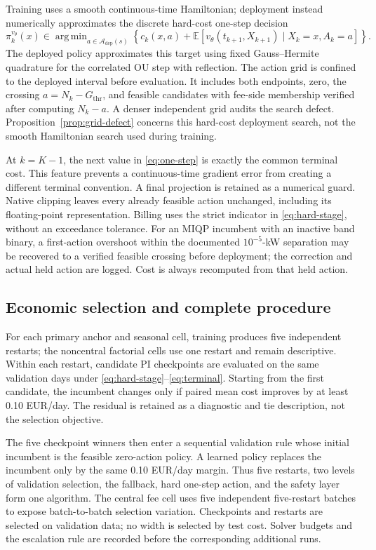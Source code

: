 \documentclass[preprint,11pt]{elsarticle}
\DeclareMathOperator*{\argmin}{arg\,min}
\newcommand{\E}{\mathbb{E}}
\newcommand{\cA}{\mathcal{A}}
\theoremstyle{plain}
\theoremstyle{remark}
\begin{document}
Training uses a smooth continuous-time Hamiltonian; deployment instead
numerically approximates the discrete hard-cost one-step decision
\begin{equation}
 \pi_k^{v_\theta}(x)\in\argmin_{a\in\cA_{\mathrm{dep}}(s)}
 \left\{c_k(x,a)+
 \E\left[v_\theta(t_{k+1},X_{k+1})\mid X_k=x,A_k=a\right]\right\}.
 \label{eq:one-step}
\end{equation}
The deployed policy approximates this target using fixed Gauss--Hermite
quadrature for the correlated OU step with reflection.
The action grid is confined to the deployed interval before evaluation. It
includes both endpoints, zero, the crossing
$a=N_k-G_{\mathrm{thr}}$, and feasible candidates with fee-side membership
verified after computing $N_k-a$. A denser independent grid audits the search
defect. Proposition~\ref{prop:grid-defect} concerns this hard-cost deployment
search, not the smooth Hamiltonian search used during training.

At $k=K-1$, the next value in \eqref{eq:one-step} is exactly the common
terminal cost. This feature prevents a continuous-time gradient error from
creating a different terminal convention. A final projection is
retained as a numerical guard. Native clipping leaves every already feasible
action unchanged, including its floating-point representation. Billing uses
the strict indicator in \eqref{eq:hard-stage}, without an exceedance tolerance.
For an MIQP incumbent with an inactive band binary, a first-action overshoot
within the documented $10^{-5}$-kW separation may be recovered to a verified
feasible crossing before deployment; the correction and actual held action
are logged. Cost is always recomputed from that held action.

\subsection{Economic selection and complete procedure}

For each primary
anchor and seasonal cell, training produces five independent restarts; the
noncentral factorial cells use one restart and remain descriptive. Within each
restart,
candidate PI checkpoints are evaluated on the same validation days under
\eqref{eq:hard-stage}--\eqref{eq:terminal}. Starting from the first candidate,
the incumbent changes only if paired mean cost improves by at least 0.10
EUR/day. The residual is retained as a diagnostic and tie description, not the
selection objective.

The five checkpoint winners then enter a sequential validation rule whose
initial incumbent is the feasible zero-action policy. A learned policy replaces
the incumbent only by the same 0.10 EUR/day margin. Thus five restarts, two
levels of validation selection, the fallback, hard one-step action, and the
safety layer form one algorithm. The central fee cell uses five independent
five-restart batches to
expose batch-to-batch selection variation. Checkpoints and restarts are selected
on validation data; no width is selected by test cost. Solver budgets and the
escalation rule are recorded before the corresponding additional runs.
\end{document}

